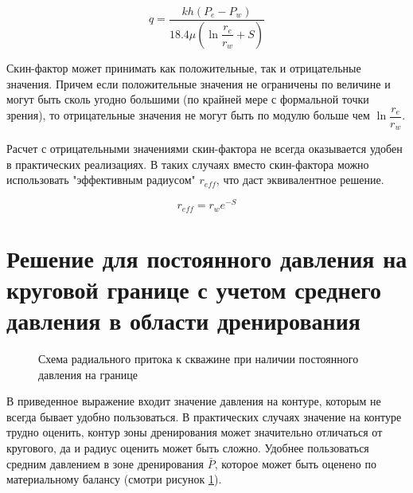 \begin{equation} \label{eq:dupui_skin_2}
q=\frac{kh\left(P_e-P_w\right)}{18.4 \mu\left(\ln{\dfrac{r_e}{r_w}} + S\right)}
\end{equation}

Скин-фактор может принимать как положительные, так и отрицательные значения. Причем если положительные значения не ограничены по величине и могут быть сколь угодно большими (по крайней мере с формальной точки зрения), то отрицательные значения не могут быть по модулю больше чем $\ln{\dfrac{r_e}{r_w}}$.

Расчет с отрицательными значениями скин-фактора не всегда оказывается удобен в практических реализациях. В таких случаях вместо скин-фактора можно использовать "эффективным радиусом" $r_{eff}$, что даст эквивалентное решение. 

\begin{equation}
	r_{eff} = r_w e^{-S}
\end{equation}




\section{Решение для постоянного давления на круговой границе с учетом среднего давления в области дренирования}

\begin{figure}[h!]
	\begin{center}
		
		\caption{Схема радиального притока к скважине при наличии постоянного давления на границе}
		\label{ris:radial_inflow_steady_state_average_pressure}
	\end{center}
\end{figure}

В приведенное выражение входит значение давления на контуре, которым не всегда бывает удобно пользоваться. В практических случаях значение на контуре трудно оценить, контур зоны дренирования может значительно отличаться от кругового, да и радиус оценить может быть сложно. Удобнее пользоваться средним давлением в зоне дренирования $\bar{P}$, которое может быть оценено по материальному балансу (смотри рисунок \ref{ris:radial_inflow_steady_state_average_pressure}). 



